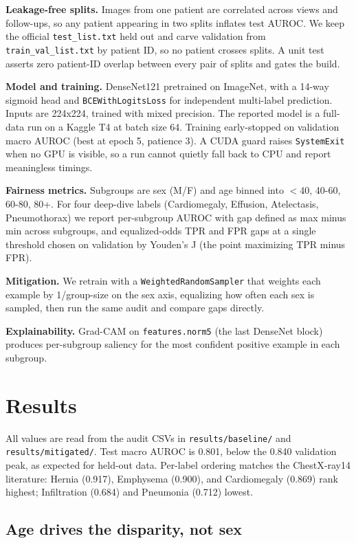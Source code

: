 \documentclass[11pt]{article}
\begin{document}
\textbf{Leakage-free splits.} Images from one patient are correlated across views and follow-ups, so any patient appearing in two splits inflates test AUROC. We keep the official \texttt{test\_list.txt} held out and carve validation from \texttt{train\_val\_list.txt} by patient ID, so no patient crosses splits. A unit test asserts zero patient-ID overlap between every pair of splits and gates the build.

\textbf{Model and training.} DenseNet121 pretrained on ImageNet, with a 14-way sigmoid head and \texttt{BCEWithLogitsLoss} for independent multi-label prediction. Inputs are 224x224, trained with mixed precision. The reported model is a full-data run on a Kaggle T4 at batch size 64. Training early-stopped on validation macro AUROC (best at epoch 5, patience 3). A CUDA guard raises \texttt{SystemExit} when no GPU is visible, so a run cannot quietly fall back to CPU and report meaningless timings.

\textbf{Fairness metrics.} Subgroups are sex (M/F) and age binned into $<$40, 40-60, 60-80, 80+. For four deep-dive labels (Cardiomegaly, Effusion, Atelectasis, Pneumothorax) we report per-subgroup AUROC with gap defined as max minus min across subgroups, and equalized-odds TPR and FPR gaps at a single threshold chosen on validation by Youden's J (the point maximizing TPR minus FPR).

\textbf{Mitigation.} We retrain with a \texttt{WeightedRandomSampler} that weights each example by 1/group-size on the sex axis, equalizing how often each sex is sampled, then run the same audit and compare gaps directly.

\textbf{Explainability.} Grad-CAM on \texttt{features.norm5} (the last DenseNet block) produces per-subgroup saliency for the most confident positive example in each subgroup.

\section{Results}

All values are read from the audit CSVs in \texttt{results/baseline/} and \texttt{results/mitigated/}. Test macro AUROC is 0.801, below the 0.840 validation peak, as expected for held-out data. Per-label ordering matches the ChestX-ray14 literature: Hernia (0.917), Emphysema (0.900), and Cardiomegaly (0.869) rank highest; Infiltration (0.684) and Pneumonia (0.712) lowest.

\subsection{Age drives the disparity, not sex}
\end{document}
